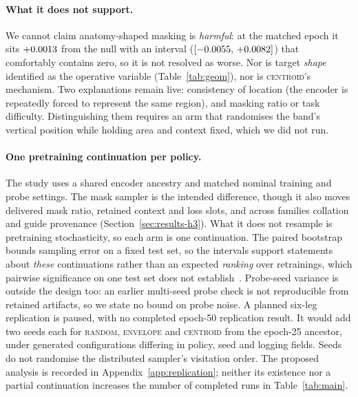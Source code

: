 \documentclass{article}
\newcommand{\ArmBest}{\textsc{centroid}}
\begin{document}
\paragraph{What it does not support.}
We cannot claim anatomy-shaped masking is \emph{harmful}: at the matched epoch it
sits $+0.0013$ from the null with an interval
($[-0.0055,\,+0.0082]$) that comfortably contains zero, so it is
not resolved as worse. Nor is target \emph{shape} identified as the
operative variable (Table~\ref{tab:geom}), nor is \ArmBest{}'s mechanism. Two
explanations remain live:
consistency of location (the encoder is repeatedly forced to represent the same
region), and masking ratio or task difficulty. Distinguishing them requires an
arm that randomises the band's vertical position while holding area and context
fixed, which we did not run.

\paragraph{One pretraining continuation per policy.}
The study uses a shared encoder ancestry and matched nominal training and probe
settings. The mask sampler is the intended
difference, though it also moves delivered mask ratio, retained context and loss
slots, and across families collation and guide provenance
(Section~\ref{sec:results-h3}). What it does not resample is pretraining
stochasticity, so each arm is one continuation.
The paired bootstrap bounds sampling error on a fixed test set, so the intervals
support statements about \emph{these} continuations rather than an expected
\emph{ranking} over retrainings, which pairwise significance on one test set does
not establish~\citep{bouthillier2021variance}. Probe-seed variance is outside the
design too: an earlier multi-seed probe check is not reproducible from retained
artifacts, so we state no bound on probe noise. A planned six-leg replication
is paused, with no completed epoch-50 replication result. It would add two
seeds each for \textsc{random}, \textsc{envelope} and \ArmBest{} from the
epoch-25 ancestor, under generated configurations differing in policy, seed
and logging fields. Seeds do not randomise the distributed sampler's visitation
order. The proposed analysis is recorded in Appendix~\ref{app:replication};
neither its existence nor a partial continuation increases the number of
completed runs in Table~\ref{tab:main}.
\end{document}
